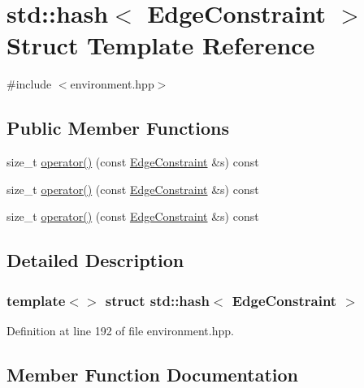 \hypertarget{structstd_1_1hash_3_01_edge_constraint_01_4}{}\section{std\+:\+:hash$<$ Edge\+Constraint $>$ Struct Template Reference}
\label{structstd_1_1hash_3_01_edge_constraint_01_4}


{\ttfamily \#include $<$environment.\+hpp$>$}

\subsection*{Public Member Functions}
\begin{DoxyCompactItemize}
\item 
size\+\_\+t \hyperlink{structstd_1_1hash_3_01_edge_constraint_01_4_a3a90f0722b2812ddbc6f12fb0f09e0e7}{operator()} (const \hyperlink{structlib_multi_robot_planning_1_1_edge_constraint}{Edge\+Constraint} \&s) const
\item 
size\+\_\+t \hyperlink{structstd_1_1hash_3_01_edge_constraint_01_4_a3a90f0722b2812ddbc6f12fb0f09e0e7}{operator()} (const \hyperlink{struct_edge_constraint}{Edge\+Constraint} \&s) const
\item 
size\+\_\+t \hyperlink{structstd_1_1hash_3_01_edge_constraint_01_4_a3a90f0722b2812ddbc6f12fb0f09e0e7}{operator()} (const \hyperlink{struct_edge_constraint}{Edge\+Constraint} \&s) const
\end{DoxyCompactItemize}


\subsection{Detailed Description}
\subsubsection*{template$<$$>$\newline
struct std\+::hash$<$ Edge\+Constraint $>$}



Definition at line 192 of file environment.\+hpp.



\subsection{Member Function Documentation}
\mbox{\label{structstd_1_1hash_3_01_edge_constraint_01_4_a3a90f0722b2812ddbc6f12fb0f09e0e7}} 

